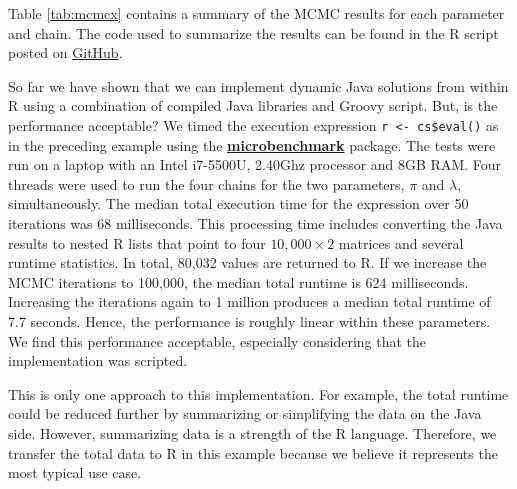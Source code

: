 \documentclass[
article,
11pt, %
a4paper, %
oneside, %
headinclude,footinclude, %
]{scrartcl}
\theoremstyle{definition} %
\theoremstyle{plain} %
\theoremstyle{remark} %
\newcommand{\pkg}[1]{\textbf{#1}}
\newcommand{\CRANpkg}[1]{\href{https://CRAN.R-project.org/package=#1}{\pkg{#1}}}
\newcommand{\code}[1]{\texttt{#1}}
\begin{document}
Table \ref{tab:mcmcx} contains a summary of the MCMC results for each parameter and chain. The code used to summarize the results can be found in the R script posted on \href{https://github.com/floidgilbert/jsr223/tree/master/examples/Groovy}{GitHub}.

So far we have shown that we can implement dynamic Java solutions from within R using a combination of compiled Java libraries and Groovy script. But, is the performance acceptable? We timed the execution expression \code{r <- cs\$eval()} as in the preceding example using the \CRANpkg{microbenchmark} package. The tests were run on a laptop with an Intel i7-5500U, 2.40Ghz processor and 8GB RAM. Four threads were used to run the four chains for the two parameters, $\pi$ and $\lambda$, simultaneously. The median total execution time for the expression over 50 iterations was 68 milliseconds. This processing time includes converting the Java results to nested R lists that point to four $10,000 \times 2$ matrices and several runtime statistics. In total, 80,032 values are returned to R. If we increase the MCMC iterations to 100,000, the median total runtime is 624 milliseconds. Increasing the iterations again to 1 million produces a median total runtime of 7.7 seconds. Hence, the performance is roughly linear within these parameters. We find this performance acceptable, especially considering that the implementation was scripted.

This is only one approach to this implementation. For example, the total runtime could be reduced further by summarizing or simplifying the data on the Java side. However, summarizing data is a strength of the R language. Therefore, we transfer the total data to R in this example because we believe it represents the most typical use case.
\end{document}
